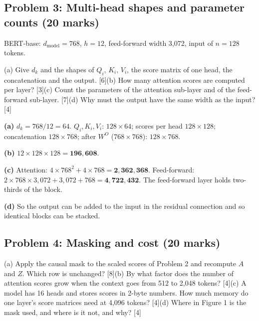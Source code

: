 \documentclass[11pt]{article}
\begin{document}
\subsection{Problem 3: Multi-head shapes and parameter counts \normalfont\small\color{GreyN}(20 marks)}

\begin{prob}BERT-base: $d_{\text{model}}=768$, $h=12$, feed-forward width 3,072, input of $n=128$ tokens.

(a) Give $d_k$ and the shapes of $Q_i$, $K_i$, $V_i$, the score matrix of one head, the concatenation and the output. [6]\newline (b) How many attention scores are computed per layer? [3]\newline (c) Count the parameters of the attention sub-layer and of the feed-forward sub-layer. [7]\newline (d) Why must the output have the same width as the input? [4]\end{prob}

\begin{soln}\textbf{(a)} $d_k=768/12=64$. $Q_i,K_i,V_i$: $128\times64$; scores per head $128\times128$; concatenation $128\times768$; after $W^O$ ($768\times768$): $128\times768$.

\textbf{(b)} $12\times128\times128=\mathbf{196{,}608}$.

\textbf{(c)} Attention: $4\times768^2+4\times768=\mathbf{2{,}362{,}368}$. Feed-forward: $2\times768\times3{,}072+3{,}072+768=\mathbf{4{,}722{,}432}$. The feed-forward layer holds two-thirds of the block.

\textbf{(d)} So the output can be added to the input in the residual connection and so identical blocks can be stacked.\end{soln}

\subsection{Problem 4: Masking and cost \normalfont\small\color{GreyN}(20 marks)}

\begin{prob}(a) Apply the causal mask to the scaled scores of Problem 2 and recompute $A$ and $Z$. Which row is unchanged? [8]\newline (b) By what factor does the number of attention scores grow when the context goes from 512 to 2,048 tokens? [4]\newline (c) A model has 16 heads and stores scores in 2-byte numbers. How much memory do one layer's score matrices need at 4,096 tokens? [4]\newline (d) Where in Figure 1 is the mask used, and where is it not, and why? [4]\end{prob}
\end{document}
